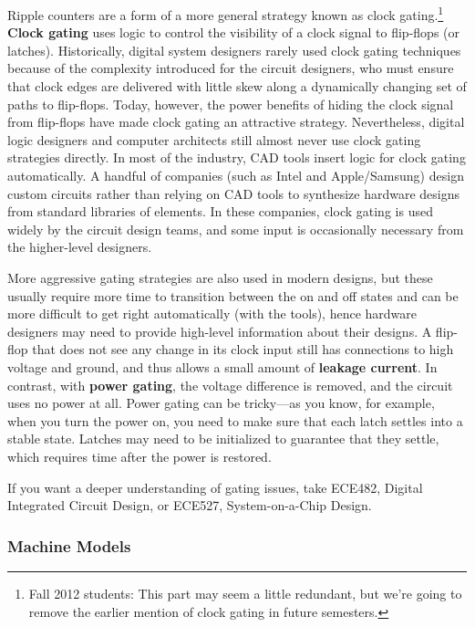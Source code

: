 Ripple counters are a form of a more general strategy known as clock
gating.\footnote{Fall 2012 students: This part may seem a little
redundant, but we're going to remove the earlier mention of clock 
gating in future semesters.}
{\bf Clock gating} uses logic to control the visibility of a
clock signal to flip-flops (or latches).  Historically, digital system
designers rarely used clock gating techniques because of the 
complexity introduced for the circuit designers, who must ensure 
that clock edges are
delivered with little skew along a dynamically changing set of
paths to flip-flops.  Today, however, the power benefits of hiding
the clock signal from flip-flops have made clock gating an attractive 
strategy.
Nevertheless, digital logic designers and computer architects still almost
never use clock gating strategies directly.  In most of the industry,
CAD tools insert logic for clock gating automatically.  
A handful of companies (such as Intel and Apple/Samsung) design 
custom circuits rather than relying on CAD tools to synthesize 
hardware designs from standard libraries of elements.
In these companies, clock gating is used widely by the circuit
design teams, and some input is occasionally necessary from the 
higher-level designers.

More aggressive gating strategies are also used in modern designs, but
these usually require more time to transition between the on and off 
states and can be more
difficult to get right automatically (with the tools), hence
hardware designers may need to provide high-level information about
their designs.  A flip-flop that does not see any change in its clock
input still has connections to high voltage and ground, and thus allows
a small amount of {\bf leakage current}.  In contrast,
with {\bf power gating}, the voltage difference is removed, and the 
circuit uses no power at all.  Power gating can be tricky---as you know,
for example, when you turn the power on, you need to make sure that
each latch settles into a stable state.  Latches may need to be 
initialized to guarantee that they settle, which requires time after
the power is restored.

If you want a deeper understanding of gating issues, take ECE482, 
Digital Integrated Circuit Design, or ECE527, System-on-a-Chip Design.
\\

\subsubsection{Machine Models}

